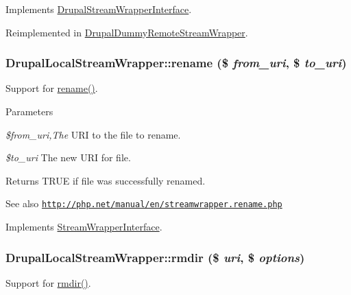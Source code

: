 Implements \hyperlink{interfaceDrupalStreamWrapperInterface_adb16cd1ac42f9d7a273546f5cbf0d9d3}{DrupalStreamWrapperInterface}.

Reimplemented in \hyperlink{classDrupalDummyRemoteStreamWrapper_afda5b6262eed01b4f22523af92ea6f9b}{DrupalDummyRemoteStreamWrapper}.\hypertarget{classDrupalLocalStreamWrapper_a0c414246b7b28f5df273ecf33ec9914a}{
\subsubsection[{rename}]{\setlength{\rightskip}{0pt plus 5cm}DrupalLocalStreamWrapper::rename (\$ {\em from\_\-uri}, \/  \$ {\em to\_\-uri})}}
\label{classDrupalLocalStreamWrapper_a0c414246b7b28f5df273ecf33ec9914a}
Support for \hyperlink{classDrupalLocalStreamWrapper_a0c414246b7b28f5df273ecf33ec9914a}{rename()}.


\begin{DoxyParams}{Parameters}
\item[{\em \$from\_\-uri,The}]URI to the file to rename. \item[{\em \$to\_\-uri}]The new URI for file.\end{DoxyParams}
\begin{DoxyReturn}{Returns}
TRUE if file was successfully renamed.
\end{DoxyReturn}
\begin{DoxySeeAlso}{See also}
\href{http://php.net/manual/en/streamwrapper.rename.php}{\tt http://php.net/manual/en/streamwrapper.rename.php} 
\end{DoxySeeAlso}


Implements \hyperlink{interfaceStreamWrapperInterface}{StreamWrapperInterface}.\hypertarget{classDrupalLocalStreamWrapper_aa9b940cbd7a7dc93d2060457da6b293d}{
\subsubsection[{rmdir}]{\setlength{\rightskip}{0pt plus 5cm}DrupalLocalStreamWrapper::rmdir (\$ {\em uri}, \/  \$ {\em options})}}
\label{classDrupalLocalStreamWrapper_aa9b940cbd7a7dc93d2060457da6b293d}
Support for \hyperlink{classDrupalLocalStreamWrapper_aa9b940cbd7a7dc93d2060457da6b293d}{rmdir()}.


